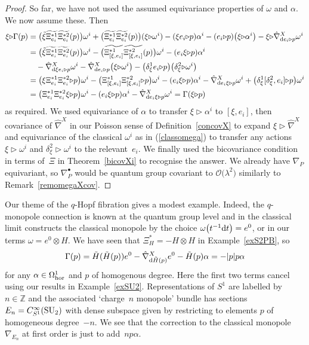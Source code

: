\documentclass[10pt,a4paper]{amsart}
\numberwithin{equation}{section}
\newcommand{\Z}{{\mathbb{Z}}}
\newcommand{\<}{{\langle}}
\renewcommand{\>}{{\rangle}}
\newcommand{\tens}{\otimes}
\newcommand{\extd}{{\rm d}}
\newcommand{\la}{{\triangleright}}
\begin{document}
\begin{proof}
So far, we have not used the assumed equivariance properties of $\omega$ and $\alpha$. We now assume these. Then
\begin{align*}\xi\la\Gamma(p)&=\big(\tilde\xi\widetilde{\Xi^{*1}_{e_i}}\widetilde{\Xi^{*2}_{e_i}}(p)\big)\omega^i + \big(\widetilde{\Xi^{*1}_{e_i}}\widetilde{\Xi^{*2}_{e_i}}(p)\big)(\xi\la\omega^i) -(\xi e_i\la p)\alpha^i- (e_i\la p)\big(\xi\la\alpha^i\big)- \xi\la \hat\nabla^X_{\extd e_i\la p}\omega^i\\
&=\big(\tilde\xi\widetilde{\Xi^{*1}_{e_i}}\widetilde{\Xi^{*2}_{e_i}}(p)\big)\omega^i
 - \big(\widetilde{\Xi^{*1}_{[\xi,e_i]}}\widetilde{\Xi^{*2}_{[\xi,e_i]}}(p)\big)\omega^i-(e_i\xi\la p)\alpha^i\\
 &\quad{} -\hat\nabla^X_{\extd \xi e_i\la p}\omega^i -\hat\nabla^X_{\extd e_i\la p}\big(\xi\la \omega^i\big)-\big( \delta^1_\xi e_i\la p\big)\big(\delta^2_\xi\la \omega^i\big)\\
 &= \big(\xi\Xi^{*1}_{e_i}\Xi^{*2}_{e_i}\la p\big)\omega^i
 - \big(\Xi^{*1}_{[\xi,e_i]}\Xi^{*2}_{[\xi,e_i]}\la p\big)\omega^i-(e_i\xi\la p)\alpha^i-\hat\nabla^X_{\extd e_i\xi\la p}\omega^i+\big( \delta^1_\xi [\delta^2_\xi,e_i]\la p\big)\omega^i \\
 &= \big(\Xi^{*1}_{e_i}\Xi^{*2}_{e_i}\xi\la p\big)\omega^i-(e_i\xi\la p)\alpha^i-\hat\nabla^X_{\extd e_i\xi\la p}\omega^i=\Gamma(\xi\la p)
\end{align*}
as required. We used equivariance of $\alpha$ to transfer $\xi\la\alpha^i$ to $[\xi,e_i]$, then covariance of $\hat\nabla^X$ in our Poisson sense of Definition~\ref{concovX} to expand $\xi\la\hat\nabla^X$ and equivariance of the classical $\omega^i$ as in (\ref{classomega}) to transfer any actions $\xi\la\omega^i$ and $\delta^2_\xi\la\omega^i$ to the relevant~$e_i$. We finally used the bicovariance condition in terms of~$\Xi$ in Theorem~\ref{bicovXi} to recognise the answer. We already have $\nabla_P$ equivariant, so $\nabla_P^\bullet$ would be quantum group covariant to $\mathcal{O}\big(\lambda^2\big)$ similarly to Remark~\ref{remomegaXcov}.
 \end{proof}


 \begin{Example} Our theme of the $q$-Hopf fibration gives a modest example. Indeed, the $q$-monopole connection is known at the quantum group level \cite{BegMa, BrzMa} and in the classical limit constructs the classical monopole by the choice $\omega \big(t^{-1}\extd t \big)=e^0$, or in our terms $\omega=e^0\tens H$. We have seen that $\Xi_H^*=-H\tens H$ in Example~\ref{exS2PB}, so
 \[ \Gamma(p)=\tilde H(\tilde H(p)) e^0-\hat\nabla^X_{\extd\tilde H(p)}e^0-\tilde H(p)\alpha=-|p|p\alpha\]
 for any $\alpha\in \Omega^1_{\rm hor}$ and $p$ of homogenous degree. Here the first two terms cancel using our results in Example~\ref{exSU2}. Representations of $S^1$ are labelled by $n\in \Z$ and the associated `charge~$n$ monopole' bundle has sections $E_n=C^\infty_{S^1}({\rm SU}_2)$ with dense subspace given by restricting to elements $p$ of homogeneous degree~$-n$. We see that the correction to the classical monopole $\nabla_{E_n}$ at first order is just to add~$n p\alpha$.
 \end{Example}
\end{document}
